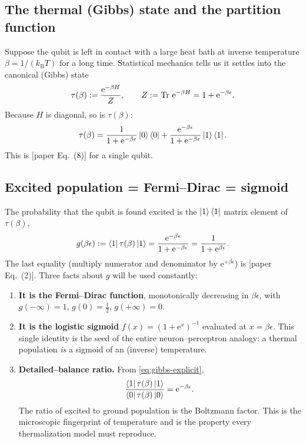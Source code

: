 \documentclass[11pt,a4paper]{article}
\newcommand{\ee}{\mathrm{e}}
\newcommand{\kB}{k_{\mathrm{B}}}
\theoremstyle{definition}
\theoremstyle{remark}
\begin{document}
\subsection{The thermal (Gibbs) state and the partition function}
Suppose the qubit is left in contact with a large heat bath at inverse
temperature $\beta = 1/(\kB T)$ for a long time. Statistical mechanics
tells us it settles into the canonical (Gibbs) state
\begin{equation}
\tau(\beta) := \frac{\ee^{-\beta H}}{Z},\qquad
Z := \Tr\,\ee^{-\beta H} = 1 + \ee^{-\beta\epsilon}.
\label{eq:gibbs}
\end{equation}
Because $H$ is diagonal, so is $\tau(\beta)$:
\begin{equation}
\tau(\beta) = \frac{1}{1+\ee^{-\beta\epsilon}}\ket{0}\bra{0}
            + \frac{\ee^{-\beta\epsilon}}{1+\ee^{-\beta\epsilon}}
              \ket{1}\bra{1}.
\label{eq:gibbs-explicit}
\end{equation}
This is [paper Eq.~(8)] for a single qubit.

\subsection{Excited population = Fermi--Dirac = sigmoid}
The probability that the qubit is found excited is the $\ket{1}\bra{1}$
matrix element of $\tau(\beta)$,
\begin{equation}
g(\beta\epsilon) := \bra{1}\tau(\beta)\ket{1}
= \frac{\ee^{-\beta\epsilon}}{1+\ee^{-\beta\epsilon}}
= \frac{1}{1+\ee^{\beta\epsilon}} .
\label{eq:fermi}
\end{equation}
The last equality (multiply numerator and denominator by
$\ee^{+\beta\epsilon}$) is [paper Eq.~(2)]. Three facts about $g$ will be
used constantly:
\begin{enumerate}[label=(\alph*),leftmargin=*]
\item \textbf{It is the Fermi--Dirac function}, monotonically decreasing
in $\beta\epsilon$, with $g(-\infty)=1$, $g(0)=\tfrac12$,
$g(+\infty)=0$.
\item \textbf{It is the logistic sigmoid} $f(x) = (1+\ee^{x})^{-1}$
evaluated at $x=\beta\epsilon$. This single identity is the seed of the
entire neuron--perceptron analogy: a thermal population \emph{is} a
sigmoid of an (inverse) temperature.
\item \textbf{Detailed--balance ratio.} From \eqref{eq:gibbs-explicit},
\begin{equation}
\frac{\bra{1}\tau(\beta)\ket{1}}{\bra{0}\tau(\beta)\ket{0}}
= \ee^{-\beta\epsilon}.
\label{eq:db-ratio}
\end{equation}
The ratio of excited to ground population is the Boltzmann factor. This
is the microscopic fingerprint of temperature and is the property every
thermalization model must reproduce.
\end{enumerate}
\end{document}
